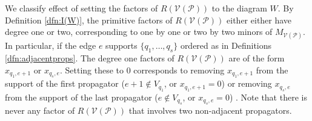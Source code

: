 \documentclass[11pt]{article}
\newcommand{\drawWLD}[2]{

\pgfmathsetmacro{\n}{#1}
\pgfmathsetmacro{\radius}{#2}
\pgfmathsetmacro{\angle}{360/\n}
\draw (0,0) circle (\radius);
    \foreach \i in {1,2,...,\n} {
      \draw (\angle*\i:\radius) node {$\bullet$};
    }

}
\newcommand{\drawprop}[4]{
\pgfmathsetmacro{\r}{#1}
\pgfmathsetmacro{\bumpr}{#2}
\pgfmathsetmacro{\s}{#3}
\pgfmathsetmacro{\bumps}{#4}
\pgfmathsetmacro{\perturbe}{\angle/\n}
\begin{scope}
\draw[smallpropagator] (\angle*\r + \angle/2 + \bumpr*\perturbe:\radius) -- (\angle*\s + \angle/2 + \bumps*\perturbe:\radius);
\end{scope}
}
\newcommand{\modifiedprop}[5]{
\pgfmathsetmacro{\r}{#1}
\pgfmathsetmacro{\bumpr}{#2}
\pgfmathsetmacro{\s}{#3}
\pgfmathsetmacro{\bumps}{#4}
\pgfmathsetmacro{\perturbe}{\angle/\n}

\begin{scope}
\clip (\angle*\r:\radius) -- (\angle + \angle*\r:\radius) -- (\angle*\s:\radius) -- (\angle + \angle*\s:\radius) -- (\angle*\r:\radius);
\draw[#5] (\angle*\r + \angle/2 + \bumpr*\perturbe:\radius) -- (\angle*\s + \angle/2 + \bumps*\perturbe:\radius);
\end{scope}
}
\newcommand{\boundaryprop}[4]{
\pgfmathsetmacro{\r}{#1}
\pgfmathsetmacro{\bumpr}{#2}
\pgfmathsetmacro{\s}{#3}
\pgfmathsetmacro{\perturbe}{\angle/\n}

\begin{scope}
\clip (\angle*\r:\radius) -- (\angle + \angle*\r:\radius) -- (\angle*\s - \angle:\radius) -- (\angle*\s:\radius) -- (\angle + \angle*\s:\radius) -- (\angle*\r:\radius);
\draw[#4] (\angle*\r + \angle/2 + \bumpr*\perturbe:\radius) -- (\angle*\s:\radius);
\end{scope}
	
}
\newcommand{\drawnumbers}{
  \foreach \i in {1,2,...,\n} {
  \pgfmathsetmacro{\x}{\angle*\i}
  \draw (\x:\radius*1.25) node {\footnotesize \i};
}
}
\def\bas #1\eas{\begin{align*} #1 \end{align*}}
\newcommand{\cP}{\mathcal{P}}
\newcommand{\cV}{\mathcal{V}}
\newcommand{\VP}{\cV(\cP)}
\theoremstyle{remark}
\theoremstyle{definition}
\begin{document}
We classify effect of setting the factors of $R(\VP)$ to the diagram $W$. By Definition \ref{dfn:I(W)}, the primitive factors of $R(\VP)$ either either have degree one or two, corresponding to one by one or two by two minors of $M_{\VP}$. In particular, if the edge $e$ supports $\{q_1, \ldots, q_s\}$ ordered as in Definitions \ref{dfn:adjacentprops}. The degree one factors of $R(\VP)$ are of the form  $x_{q_1, e+1}$ or $x_{q_s, e}$. Setting these to $0$ corresponds to removing $x_{q_1, e+1}$ from the support of the first propagator ($e+1 \not \in V_{q_1}$, or $x_{q_1, e+1} = 0 $) or removing $x_{q_s, e}$ from the support of the last propagator ($e \not \in V_{q_s}$, or $x_{q_s, e} = 0 $) . Note that there is never any factor of $R(\VP)$ that involves two non-adjacent propagators. %

\begin{comment}
\bas   \begin{tikzpicture}[rotate=67.5,baseline=(current bounding box.east)]
	\begin{scope}
	\drawWLD{10}{1.5}
	\drawnumbers
	\boundaryprop{1}{0}{9}{propagator, dashed}
	\drawprop{3}{0}{8}{0}
        \drawprop{5}{0}{8}{-1}
		\end{scope}
	\end{tikzpicture} \text{ or } \begin{tikzpicture}[rotate=67.5,baseline=(current bounding box.east)]
	\begin{scope}
	\drawWLD{10}{1.5}
	\drawnumbers
	\drawprop{1}{0}{8}{1}
	\drawprop{3}{0}{8}{0}
        \boundaryprop{5}{0}{8}{propagator, dashed}
		\end{scope}
	\end{tikzpicture} \;.\eas Note that unless there is exactly one propagator adjacent on an edge, there is at most ever one variable corresponding to that edge that is a factor of $R(\VP)$. 

Similarly, the degree two factors corresponds to setting two pairs of variables, ($x_{q_i, e} , x_{q_i e+1}$) and ($x_{q_{i+1}, e} , x_{q_{i+1}, e+1}$), precisely those supporting adjacent propagators on an edge, as scalar multiples of each other. Diagrammatically, we depict this as  we draw this by making two adjacent propagators meet on the common edge. Again, from display \eqref{eq:relevantexample}, with $e = 8$, \bas   \begin{tikzpicture}[rotate=67.5,baseline=(current bounding box.east)]
	\begin{scope}
	\drawWLD{10}{1.5}
	\drawnumbers
	\modifiedprop{1}{0}{8}{2}{propagator, dashed}
	\modifiedprop{3}{0}{8}{2}{propagator, dashed}
        \drawprop{5}{0}{8}{-1}
		\end{scope}
	\end{tikzpicture} \;.\eas.    \todo{is the diagramatics actualy useful here?}
\end{comment}
\end{document}
